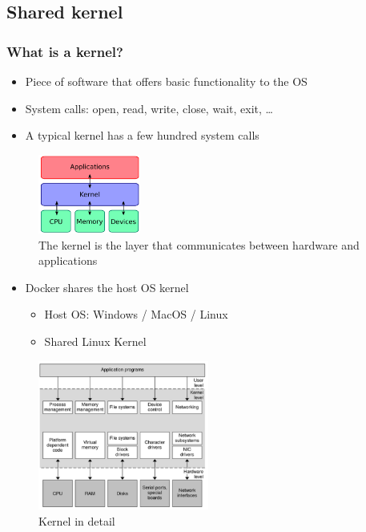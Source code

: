 \documentclass{article}
\begin{document}
\subsection{Shared kernel}

\subsubsection{What is a kernel?}

\begin{itemize}
    \item Piece of software that offers basic functionality to the OS
    \item System calls: open, read, write, close, wait, exit, \dots
    \item A typical kernel has a few hundred system calls
\end{itemize}

\begin{figure}[H]
    \centering
    \includegraphics[width=0.3\textwidth]{kernel.png}
    \caption{The kernel is the layer that communicates between hardware and applications}
\end{figure}


\begin{itemize}
    \item Docker shares the host OS kernel
    \begin{itemize}
        \item Host OS: Windows / MacOS / Linux
        \item Shared Linux Kernel
    \end{itemize}
\end{itemize}

\begin{figure}[H]
    \centering
    \includegraphics[width=0.5\textwidth]{kernel2.png}
    \caption{Kernel in detail}
\end{figure}
\end{document}
